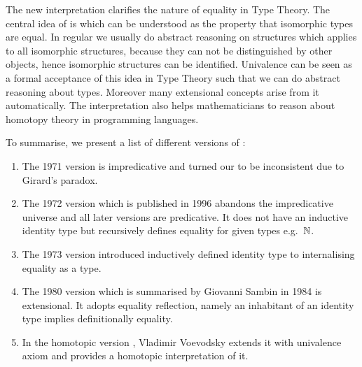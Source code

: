 



The new interpretation clarifies the nature of equality in Type Theory.
The central idea of \hott is  which can be understood as the property that isomorphic types are equal.
In regular \maths we usually do abstract reasoning on structures which applies to all isomorphic structures, because they can not be distinguished by other objects, hence isomorphic structures can be identified. Univalence can be seen as a formal acceptance of this idea in Type Theory such that we can do abstract reasoning about types. Moreover many extensional concepts arise from it automatically. The interpretation also helps mathematicians to reason about homotopy theory in programming languages.


To summarise, we present a list of different versions of \mltt:

\begin{enumerate}

\item The 1971 version \cite{per:71} is impredicative and turned our to be inconsistent due to Girard's paradox.

\item The 1972 version which is published in 1996 \cite{Martin-Lof-1972} abandons the impredicative universe and all later versions are predicative. It does not have an inductive identity type but recursively defines equality for given types e.g.\ $\mathbb{N}$.

\item The 1973 version \cite{Martin-Lof-1973} introduced inductively defined identity type to internalising equality as a type. 

\item The 1980 version which is summarised by Giovanni Sambin in 1984 \cite{martin1984intuitionistic} is extensional. It adopts equality reflection, namely an inhabitant of an identity type implies definitionally equality.

\item In the homotopic version \cite{hott}, Vladimir Voevodsky extends it with univalence axiom and provides a homotopic interpretation of it.

\end{enumerate}



